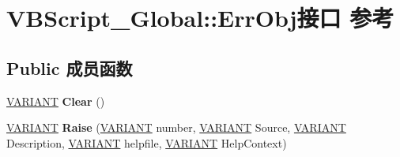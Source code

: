 \hypertarget{interface_v_b_script___global_1_1_err_obj}{}\section{V\+B\+Script\+\_\+\+Global\+:\+:Err\+Obj接口 参考}
\label{interface_v_b_script___global_1_1_err_obj}
\subsection*{Public 成员函数}
\begin{DoxyCompactItemize}
\item 
\mbox{\label{interface_v_b_script___global_1_1_err_obj_a1b23e99bb4ca6f0305947e55d02403a8}} 
\hyperlink{structtag_v_a_r_i_a_n_t}{V\+A\+R\+I\+A\+NT} {\bfseries Clear} ()
\item 
\mbox{\label{interface_v_b_script___global_1_1_err_obj_a4616def76f1efe5cdf2fb0de857757ec}} 
\hyperlink{structtag_v_a_r_i_a_n_t}{V\+A\+R\+I\+A\+NT} {\bfseries Raise} (\hyperlink{structtag_v_a_r_i_a_n_t}{V\+A\+R\+I\+A\+NT} number, \hyperlink{structtag_v_a_r_i_a_n_t}{V\+A\+R\+I\+A\+NT} Source, \hyperlink{structtag_v_a_r_i_a_n_t}{V\+A\+R\+I\+A\+NT} Description, \hyperlink{structtag_v_a_r_i_a_n_t}{V\+A\+R\+I\+A\+NT} helpfile, \hyperlink{structtag_v_a_r_i_a_n_t}{V\+A\+R\+I\+A\+NT} Help\+Context)
\end{DoxyCompactItemize}
